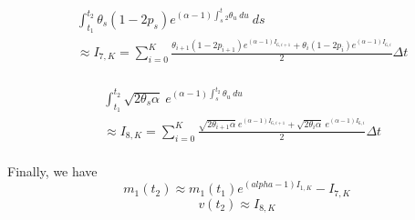 \documentclass[a4paper, 12pt]{article}
\begin{document}
\begin{itemize}
\begin{itemize}
\begin{equation*}
	\begin{split}
	& \int_{t_1}^{t_2} \theta_s (1-2p_s) e^{(\alpha-1)\int_s^t_2 \theta_u \ du } \ ds \\
	& \approx I_{7,K}= \sum_{i=0}^K \frac{    \theta_{i+1} (1-2p_{i+1}) e^{(\alpha-1)I_{6,i+1} }    +    \theta_{i} (1-2p_{i}) e^{(\alpha-1)I_{6,i} }      }{2}\Delta t \\
	\end{split}
\end{equation*}

\begin{equation*}
	\begin{split}
	& \int_{t_1}^{t_2} \sqrt{2 \theta_s \alpha} \ e^{(\alpha-1)\int_s^{t_2} \theta_u \ du } \\
	& \approx I_{8,K}= \sum_{i=0}^K \frac{     \sqrt{2 \theta_{i+1} \alpha} \ e^{(\alpha-1)I_{6,i+1} }    +     \sqrt{2 \theta_{i} \alpha} \ e^{(\alpha-1)I_{6,i} }      }{2}\Delta t \\
	\end{split}
\end{equation*}

Finally, we have
		\begin{equation}
			m_{1}(t_2)  \approx m_1(t_1) e^{(alpha-1)I_{1,K}} - I_{7,K}
	\end{equation}
	\begin{equation}
		v(t_2)  \approx I_{8,K}
\end{equation}


\end{itemize}


\end{itemize}
\end{document}
